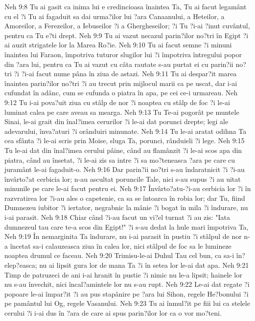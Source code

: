 Neh 9:8  Tu ai gasit ca inima lui e credincioasa înaintea Ta, Tu ai facut legamânt cu el ?i Tu ai fagaduit sa dai urma?ilor lui ?ara Canaanului, a Heteilor, a Amoreilor, a Ferezeilor, a Iebuseilor ?i a Ghergheseilor; ?i Tu ?i-ai ?inut cuvântul, pentru ca Tu e?ti drept.
Neh 9:9  Tu ai vazut necazul parin?ilor no?tri în Egipt ?i ai auzit strigatele lor la Marea Ro?ie.
Neh 9:10  Tu ai facut semne ?i minuni înaintea lui Faraon, împotriva tuturor slugilor lui ?i împotriva întregului popor din ?ara lui, pentru ca Tu ai vazut cu câta rautate s-au purtat ei cu parin?ii no?tri ?i ?i-ai facut nume pâna în ziua de astazi.
Neh 9:11  Tu ai despar?it marea înaintea parin?ilor no?tri ?i au trecut prin mijlocul marii ca pe uscat, dar i-ai cufundat în adânc, cum se cufunda o piatra în apa, pe cei ce-i urmareau.
Neh 9:12  Tu i-ai pova?uit ziua cu stâlp de nor ?i noaptea cu stâlp de foc ?i le-ai luminat calea pe care aveau sa mearga.
Neh 9:13  Tu Te-ai pogorât pe muntele Sinai, le-ai grait din înal?imea cerurilor ?i le-ai dat porunci drepte; legi ale adevarului, înva?aturi ?i orânduiri minunate.
Neh 9:14  Tu le-ai aratat odihna Ta cea sfânta ?i le-ai scris prin Moise, sluga Ta, porunci, rânduieli ?i lege.
Neh 9:15  Tu le-ai dat din înal?imea cerului pâine, când au flamânzit ?i le-ai scos apa din piatra, când au însetat, ?i le-ai zis sa intre ?i sa mo?teneasca ?ara pe care cu juramânt le-ai fagaduit-o.
Neh 9:16  Dar parin?ii no?tri s-au îndaratnicit ?i ?i-au învârto?at cerbicia lor; n-au ascultat poruncile Tale, nici s-au supus ?i au uitat minunile pe care le-ai facut pentru ei.
Neh 9:17  Învârto?atu-?i-au cerbicia lor ?i în razvratirea lor ?i-au ales o capetenie, ca sa se întoarca în robia lor; dar Tu, fiind Dumnezeu iubitor ?i iertator, negrabnic la mânie ?i bogat în mila ?i îndurare, nu i-ai parasit.
Neh 9:18  Chiar când ?i-au facut un vi?el turnat ?i au zis: "Iata dumnezeul tau care te-a scos din Egipt!" ?i s-au dedat la hule mari împotriva Ta,
Neh 9:19  În nemarginita Ta îndurare, nu i-ai parasit în pustiu ?i stâlpul de nor n-a încetat sa-i calauzeasca ziua în calea lor, nici stâlpul de foc sa le lumineze noaptea drumul ce faceau.
Neh 9:20  Trimisu-le-ai Duhul Tau cel bun, ca sa-i în?elep?easca; nu ai lipsit gura lor de mana Ta ?i în setea lor le-ai dat apa.
Neh 9:21  Timp de patruzeci de ani i-ai hranit în pustie ?i nimic nu le-a lipsit; hainele lor nu s-au învechit, nici încal?amintele lor nu s-au rupt.
Neh 9:22  Le-ai dat regate ?i popoare le-ai împar?it ?i au pus stapânire pe ?ara lui Sihon, regele He?bonului ?i pe pamântul lui Og, regele Vasanului.
Neh 9:23  Tu ai înmul?it pe fiii lui ca stelele cerului ?i i-ai dus în ?ara de care ai spus parin?ilor lor ca o vor mo?teni.
